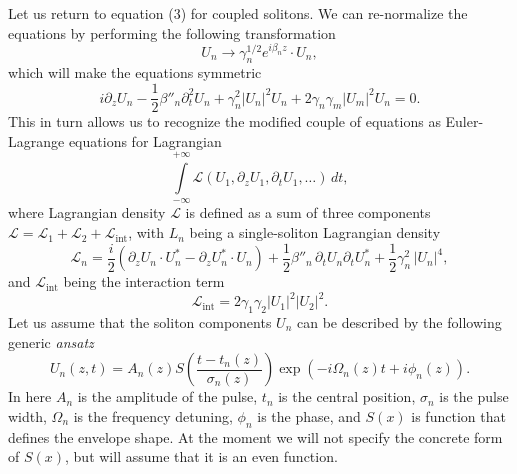 \documentclass[a4paper, 11pt]{article}
\newcommand{\abs}[1]{\left| #1 \right|}
\begin{document}
Let us return to equation (3) for coupled solitons. We can re-normalize the equations by performing the following transformation
\begin{equation*}
  U_{n} \to \gamma_{n}^{1/2} e^{i \beta_{n} z} \cdot U_{n},
\end{equation*}
which will make the equations symmetric
\begin{equation*}
  i \partial_{z} U_{n}
    - \frac{1}{2} \beta''_{n} \partial_{t}^{2} U_{n}
    + \gamma_{n}^{2} \abs{U_{n}}^{2} U_{n}
    + 2 \gamma_{n} \gamma_{m} \abs{U_{m}}^{2} U_{n} = 0.
\end{equation*}
This in turn allows us to recognize the modified couple of equations as Euler-Lagrange equations for Lagrangian
\begin{equation*}
  \int \limits_{-\infty}^{+\infty}
    \mathcal{L}(U_{1}, \partial_{z} U_{1}, \partial_{t} U_{1}, \ldots)
    \, dt,
\end{equation*}
where Lagrangian density $\mathcal{L}$ is defined as a sum of three components $\mathcal{L} = \mathcal{L}_{1} + \mathcal{L}_{2} + \mathcal{L}_{\text{int}}$, with $L_{n}$ being a single-soliton Lagrangian density
\begin{equation}
  \label{eq:SingleSolitonLagrangianDensity}
  \mathcal{L}_{n} =
  \frac{i}{2} \left(
    \partial_{z} U_{n} \cdot U_{n}^{*} -
    \partial_{z} U_{n}^{*} \cdot U_{n}
  \right)
  + \frac{1}{2} \beta''_{n} \, \partial_{t} U_{n} \partial_{t} U_{n}^{*}
  + \frac{1}{2} \gamma_{n}^{2} \, \abs{U_{n}}^{4},
\end{equation}
and $\mathcal{L}_{\text{int}}$ being the interaction term
\begin{equation}
  \label{eq:InteractionLagrangianDensity}
  \mathcal{L}_{\text{int}} =
    2 \gamma_{1} \gamma_{2}
    \abs{U_{1}}^{2} \abs{U_{2}}^{2}.
\end{equation}
Let us assume that the soliton components $U_{n}$ can be described by the following generic \textit{ansatz}
\begin{equation}
  \label{eq:SolitonAnsatz}
  U_{n}(z, t) = A_{n}(z) S\left(
    \frac{t - t_{n}(z)}{\sigma_{n}(z)}
  \right) \exp\left(
    - i \Omega_{n}(z) t + i \phi_{n}(z)
  \right).
\end{equation}
In here $A_{n}$ is the amplitude of the pulse, $t_{n}$ is the central position, $\sigma_{n}$ is the pulse width, $\Omega_{n}$ is the frequency detuning, $\phi_{n}$ is the phase, and $S(x)$ is function that defines the envelope shape. At the moment we will not specify the concrete form of $S(x)$, but will assume that it is an even function.
\end{document}
